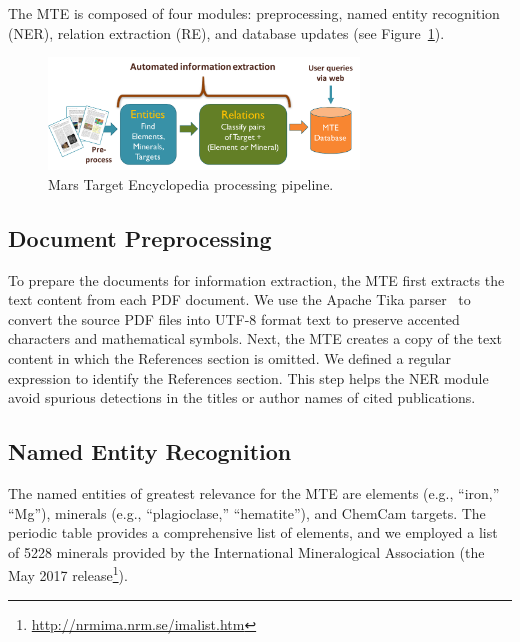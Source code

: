 \documentclass[letterpaper]{article} %
\begin{document}
The MTE is composed of four modules: preprocessing, named entity
recognition (NER), relation extraction (RE), and database updates (see
Figure~\ref{fig:mte}).

\begin{figure}
\begin{center}
\includegraphics[width=3.25in]{fig/system.pdf}
\end{center}
\caption{Mars Target Encyclopedia processing pipeline.}
\label{fig:mte}
\end{figure}

\subsection{Document Preprocessing}

To prepare the documents for information extraction, the MTE first
extracts the text content from each PDF document.  We use the Apache
Tika parser~\cite{mattmann:tika11} to convert the source PDF files
into UTF-8 format text to preserve accented characters and
mathematical symbols.
Next, the MTE creates a copy of the text content in which the
References section is omitted.  We defined a regular expression to
identify the References section.
This step helps the NER module avoid spurious detections in the
titles or author names of cited publications.

\subsection{Named Entity Recognition}

The named entities of greatest relevance for the MTE are elements
(e.g., ``iron,'' ``Mg''), minerals (e.g., ``plagioclase,''
``hematite''), and ChemCam targets.  The periodic table provides a
comprehensive list of elements, and we employed a list of 5228
minerals provided by the International Mineralogical Association (the
May 2017 release\footnote{\url{http://nrmima.nrm.se/imalist.htm}}). 
\end{document}
